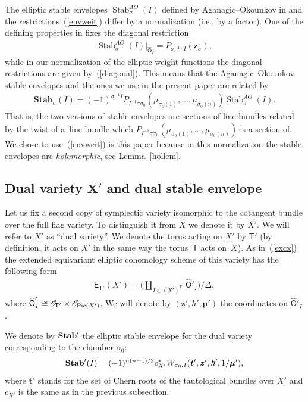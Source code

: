 \documentclass[10pt,a4paper]{amsart}
\DeclareMathOperator\Stab{Stab}
\newcommand{\bT}{\mathsf{T}}
\newcommand{\Or}{\textsf{O}}
\newcommand{\cE}{\mathscr{E}}
\def\ttt{{\boldsymbol t}}
\def\zz{{\boldsymbol z}}
\def\mub{{\boldsymbol\mu}}
\numberwithin{equation}{section}
\begin{document}
\begin{Remark} The elliptic stable envelopes $\Stab^{AO}_{\sigma}(I)$ defined by Aganagic--Okounkov in \cite{AOelliptic} and the restrictions~(\ref{envweit}) differ by a normalization (i.e., by a factor). One of the defining properties in \cite{AOelliptic} fixes the diagonal restriction
\begin{gather*}
 \Stab^{AO}_{\sigma}(I)\big|_{\widehat{\Or}_{I}}=P_{\sigma^{-1} \cdot I}(\zz_{\sigma}),
\end{gather*}
while in our normalization of the elliptic weight functions the diagonal restrictions are given by~(\ref{diagonal}). This means that the Aganagic--Okounkov stable envelopes and the ones we use in the present paper are related by
\begin{gather*}
\textbf{Stab}_{\sigma}(I)=(-1)^{\sigma^{-1} I} P_{I^{-1} \sigma \sigma_{0}}(\mu_{\sigma_0(1)},\dots,\mu_{\sigma_0(n)}) \Stab^{AO}_{\sigma}(I).
\end{gather*}
That is, the two versions of stable envelopes are sections of line bundles related by the twist of a~line bundle which $P_{I^{-1} \sigma \sigma_{0}}(\mu_{\sigma_0(1)}, \dots,\mu_{\sigma_0(n)})$ is a section of. We chose to use~(\ref{envweit}) is this paper because in this normalization the stable envelopes are \textit{holomorphic}, see Lemma~\ref{hollem}.
\end{Remark}

\subsection[Dual variety $X'$ and dual stable envelope]{Dual variety $\boldsymbol{X'}$ and dual stable envelope}
 Let us fix a second copy of symplectic variety isomorphic to the cotangent bundle over the full flag variety. To distinguish it from $X$ we denote it by $X'$. We will refer to $X'$ as ``dual variety''. We denote the torus acting on $X'$ by $\bT'$ (by definition, it acts on $X'$ in the same way the torus~$\bT$ acts on~$X$). As in~(\ref{excx}) the extended equivariant elliptic cohomology scheme of this variety has the following form
\begin{gather} \label{duext}
\textsf{E}_{\bT'}(X')=\bigg(\coprod\limits_{I\in (X')^{\bT'}} \widehat{\Or}'_{I}\bigg)/\Delta,
\end{gather}
 where $\widehat{\Or}'_{I}\cong \cE_{\bT'} \times \cE_{{\rm Pic}(X')}$. We will denote by $(\zz',\hbar',\mub')$ the coordinates on $\widehat{\Or}'_{I}$.

We denote by ${\bf Stab}'$ the elliptic stable envelope for the dual variety corresponding to the chamber $\sigma_{0}$:
 \begin{gather} \label{duenv}
 {\bf Stab}' (I)=(-1)^{n(n-1)/2} c_{X'}^{*} W_{\sigma_{0},I}(\ttt',\zz',\hbar',1/\mub'),
 \end{gather}
where $\ttt'$ stands for the set of Chern roots of the tautological bundles over $X'$ and $c_{X'}$ is the same as in the previous subsection.
\end{document}
